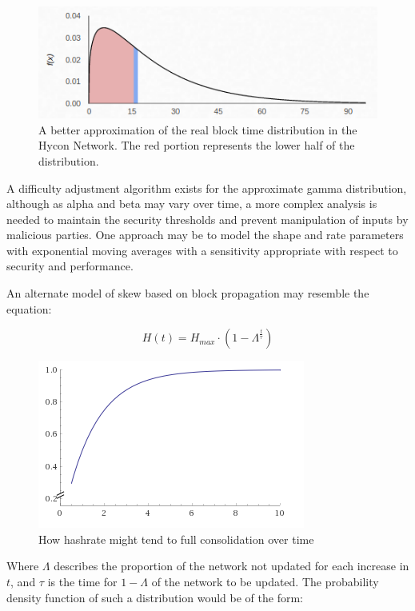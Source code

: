 \documentclass[]{article}
\begin{document}
\begin{figure}[h]
	\centering
	\includegraphics[width=0.7\linewidth]{"./real hycon"}
	\caption{\footnotesize A better approximation of the real block time distribution in the Hycon Network. The red portion represents the lower half of the distribution. \cite{GammaDistHycon}}
\end{figure}

A difficulty adjustment algorithm exists for the approximate gamma distribution, although as alpha and beta may vary over time, a more complex analysis is needed to maintain the security thresholds and prevent manipulation of inputs by malicious parties.  One approach may be to model the shape and rate parameters with exponential moving averages with a sensitivity appropriate with respect to security and performance.  
\newline

\pagebreak

An alternate model of skew based on block propagation may resemble the equation: 

\begin{equation}
	H(t) = H_{max} \cdot (1 - \Lambda^\frac{t}{\tau})
\end{equation}

\begin{figure}[h]
	\centering
	\includegraphics[width=0.7\linewidth]{"./hashpower ramp"}
	\caption{\footnotesize How hashrate might tend to full consolidation over time \cite{Wolfram}}
\end{figure}

Where $\Lambda$ describes the proportion of the network not updated for each increase in $t$, and $\tau$ is the time for $1 - \Lambda$ of the network to be updated. The probability density function of such a distribution would be of the form: 
\end{document}
